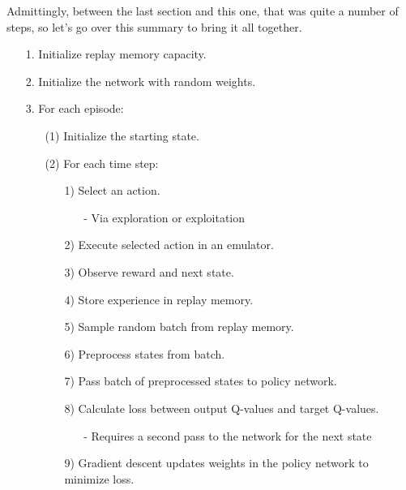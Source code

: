 Admittingly, between the last section and this one, that was quite a number of steps, so 
let's go over this summary to bring it all together.

\begin{itemize}
\setlength{\parskip}{0pt}
\item[1.]
Initialize replay memory capacity.

\item[2.]
Initialize the network with random weights.

\item[3.]
For each episode:
	\begin{itemize}
	\item[(1)]
	Initialize the starting state.

	\item[(2)]
	For each time step:
		\begin{itemize}
		\item[1)]
		Select an action.
			\begin{itemize}
			\item[-]
			Via exploration or exploitation
			\end{itemize}

		\item[2)]
		Execute selected action in an emulator.

		\item[3)]
		Observe reward and next state.

		\item[4)]
		Store experience in replay memory.

		\item[5)]
		Sample random batch from replay memory.

		\item[6)]
		Preprocess states from batch.

		\item[7)]
		Pass batch of preprocessed states to policy network.

		\item[8)]
		Calculate loss between output Q-values and target Q-values.
			\begin{itemize}
			\item[-]
			Requires a second pass to the network for the next state
			\end{itemize}

		\item[9)]
		Gradient descent updates weights in the policy network to minimize loss.
		\end{itemize}
	\end{itemize}
\end{itemize}


